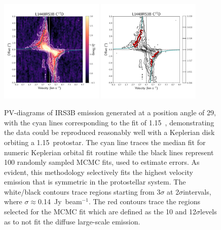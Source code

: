 






\begin{figure}[H]
\begin{center}
\includegraphics[width=0.44\textwidth]{img/irs3b_c17o_pv.pdf}
\includegraphics[width=0.44\textwidth]{img/PV-Diagram_L1448IRS3B_C17O_image_taper1500k_fit_xtr.pdf}
\end{center}
\caption{PV-diagrams of IRS3B \cso\space emission generated at a position angle of 29\deg, with the cyan lines corresponding to the fit of 1.15~\solm, demonstrating the data could be reproduced reasonably well with a Keplerian disk orbiting a 1.15~\solm\space protostar. The cyan line traces the median fit for numeric Keplerian orbital fit routine while the black lines represent 100 randomly sampled MCMC fits, used to estimate errors. As evident, this methodology selectively fits the highest velocity emission that is symmetric in the protostellar system. The white/black contours trace regions starting from 3$\sigma$ at 2$\sigma$\space intervals, where $\sigma\approx$0.14~Jy~beam$^{-1}$. The red contours trace the regions selected for the MCMC fit which are defined as the 10 and 12$\sigma$\space levels as to not fit the diffuse large-scale emission.}\label{fig:l1448irs3b_c17o_pv}
\end{figure}








